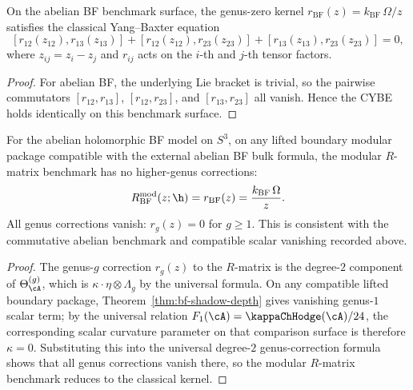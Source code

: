 \begin{proposition}
On the abelian BF benchmark surface, the genus-zero kernel
$r_{\mathrm{BF}}(z)=k_{\mathrm{BF}}\,\Omega/z$ satisfies the classical Yang--Baxter equation
\begin{equation}
[r_{12}(z_{12}), r_{13}(z_{13})] + [r_{12}(z_{12}), r_{23}(z_{23})]
+ [r_{13}(z_{13}), r_{23}(z_{23})] = 0,
\end{equation}
where $z_{ij} = z_i - z_j$ and $r_{ij}$ acts on the $i$-th and $j$-th tensor
factors.
\end{proposition}

\begin{proof}
For abelian BF, the underlying Lie bracket is trivial, so the pairwise commutators
$[r_{12},r_{13}]$, $[r_{12},r_{23}]$, and $[r_{13},r_{23}]$ all vanish. Hence the
CYBE holds identically on this benchmark surface.
\end{proof}

\begin{theorem}
For the abelian holomorphic BF model on $S^3$, on any lifted boundary modular
package compatible with the external abelian BF bulk formula, the modular
$R$-matrix benchmark has no higher-genus corrections:
\begin{equation}
R_{\mathrm{BF}}^{\mathrm{mod}}(z; \h) = r_{\mathrm{BF}}(z) = \frac{k_{\mathrm{BF}}\,\Omega}{z}.
\end{equation}
All genus corrections vanish: $r_g(z) = 0$ for $g \geq 1$. This is consistent with
the commutative abelian benchmark and compatible scalar vanishing recorded above.
\end{theorem}

\begin{proof}
The genus-$g$ correction $r_g(z)$ to the $R$-matrix is the degree-$2$ component of
$\Theta_\cA^{(g)}$, which is $\kappa \cdot \eta \otimes \Lambda_g$ by the universal
formula. On any compatible lifted boundary package,
Theorem~\ref{thm:bf-shadow-depth} gives vanishing genus-$1$ scalar term; by the
universal relation $F_1(\cA)=\kappaChHodge(\cA)/24$, the corresponding scalar curvature
parameter on that comparison surface is therefore $\kappa=0$. Substituting this
into the universal degree-$2$ genus-correction formula shows that all genus
corrections vanish there, so the modular $R$-matrix benchmark reduces to the
classical kernel.
\end{proof}

